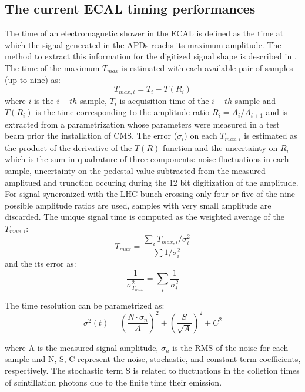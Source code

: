 \subsection{The current ECAL timing performances}
\label{sec:ecal_time_run1}
The time of an electromagnetic shower in the ECAL is defined as the time at which the signal generated
in the APDs reachs its maximum amplitude. The method to extract this information for the digitized signal
shape is described in \cite{ecal_time_reco}. The time of the maximum $T_{max}$ is estimated with each
available pair of samples (up to nine) as:
\[
T_{max, i} = T_i - T(R_i)
\]
where $i$ is the $i-th$ sample, $T_i$ is acquisition time of the $i-th$ sample and $T(R_i)$ is the time
corresponding to the amplitude ratio $R_i = A_i/A_{i+1}$ and is extracted from a parametrization whose parameters
were measured in a test beam prior the installation of CMS. The error ($\sigma_i$) on each $T_{max, i}$ is estimated as
the product of the derivative of the $T(R)$ function and the uncertainty on $R_i$ which is the sum in quadrature
of three components: noise fluctuations in each sample, uncertainty on the pedestal value subtracted from the measured amplitued
and trunction occuring during the 12 bit digitization of the amplitude.
For signal syncronized with the LHC bunch crossing only four or five of the nine possible amplitude
ratios are used, samples with very small amplitude are discarded. The unique signal time is computed
as the weighted average of the  $T_{max, i}$:
\[
  T_{max} = \frac{\sum_i T_{max, i}/\sigma_i^2}{\sum 1/\sigma_i^2}
\]
and the its error as:
\[
  \frac{1}{\sigma_{T_{max}}^2} = \sum_i\frac{1}{\sigma_i^2}
\]

The time resolution can be parametrized as:
\begin{equation}
  \sigma^2(t) = \left( \frac{N\cdot\sigma_n}{A} \right)^2 + \left( \frac{S}{\sqrt{A}} \right)^2 + C^2  
\end{equation}
\label{eq:general_time_res}

where A is the measured signal amplitude, $\sigma_n$ is the RMS of the noise for each sample and
N, S, C represent the noise, stochastic, and constant term coefficients, respectively.
The stochastic term S is related to fluctuations in the colletion times of scintillation photons due to
the finite time their emission.


